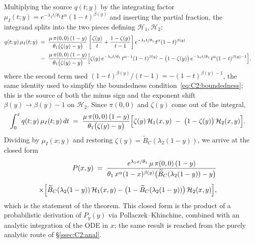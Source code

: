 Multiplying the source $q(t;y)$ by the integrating factor $\mu_I(t;y)=e^{-\lambda_1 t/\theta_1}t^{\alpha}(1-t)^{\beta(y)}$ and inserting the partial fraction, the integrand splits into the two pieces defining $\mathcal{H}_1,\mathcal{H}_2$:
\begin{align*}
    q(t;y)\,\mu_I(t;y)
    &\;=\; \frac{\mu\,\pi(0,0)\,(1-y)}{\theta_1\bigl(\zeta(y)-y\bigr)}
      \left[\frac{\zeta(y)}{t} + \frac{1-\zeta(y)}{t-1}\right]
      e^{-\lambda_1 t/\theta_1}\,t^{\alpha}(1-t)^{\beta(y)} \\
    &\;=\; \frac{\mu\,\pi(0,0)\,(1-y)}{\theta_1\bigl(\zeta(y)-y\bigr)}
      \Bigl[\zeta(y)\,e^{-\lambda_1 t/\theta_1}\,t^{\alpha-1}(1-t)^{\beta(y)}
      - \bigl(1-\zeta(y)\bigr)\,e^{-\lambda_1 t/\theta_1}\,t^{\alpha}(1-t)^{\beta(y)-1}\Bigr],
\end{align*}
where the second term used $(1-t)^{\beta(y)}/(t-1) = -(1-t)^{\beta(y)-1}$, the same identity used to simplify the boundedness condition~\eqref{eq:C2:boundedness}; this is the source of both the minus sign and the exponent shift $\beta(y)\to\beta(y)-1$ on $\mathcal{H}_2$.
Since $\pi(0,0)$ and $\zeta(y)$ come out of the integral,
\begin{equation}
    \int_0^x q(t;y)\,\mu_I(t;y)\,dt \;=\; \frac{\mu\,\pi(0,0)\,(1-y)}{\theta_1\bigl(\zeta(y)-y\bigr)}\Bigl[\zeta(y)\,\mathcal{H}_1(x,y) \;-\; \bigl(1-\zeta(y)\bigr)\,\mathcal{H}_2(x,y)\Bigr].
\end{equation}
Dividing by $\mu_I(x;y)$ and restoring $\zeta(y)=\widetilde{B}_C(\lambda_2(1-y))$, we arrive at the closed form
\begin{align}
    \begin{split}
        P(x,y) \;=\; \frac{e^{\lambda_1 x/\theta_1}\,\mu\,\pi(0,0)\,(1-y)}{\theta_1\, x^{\alpha}(1-x)^{\beta(y)}\bigl(\widetilde{B}_C(\lambda_2(1-y))-y\bigr)}\\[4pt]
        \times \Bigl[\widetilde{B}_C(\lambda_2(1-y))\,\mathcal{H}_1(x,y) - \bigl(1-\widetilde{B}_C(\lambda_2(1-y))\bigr)\,\mathcal{H}_2(x,y)\Bigr],
    \end{split}\label{eq:C2:Pxy}
\end{align}
which is the statement of the theorem. This closed form is the product of a probabilistic derivation of $P_y(y)$ via Pollaczek--Khinchine, combined with an analytic integration of the ODE in $x$; the same result is reached from the purely analytic route of \S\ref{ssec:C2:anal}.


